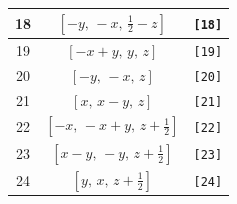 \documentclass[fleqn,8pt]{jsarticle}
\begin{document}
\begin{longtable}{ccc}
18 & $\left[ - y,\, - x,\, \frac{1}{2} - z \right]$ & {\tt [18]} \\ \hline
19 & $\left[ - x + y,\, y,\, z \right]$ & {\tt [19]} \\ \hline
20 & $\left[ - y,\, - x,\, z \right]$ & {\tt [20]} \\ \hline
21 & $\left[ x,\, x - y,\, z \right]$ & {\tt [21]} \\ \hline
22 & $\left[ - x,\, - x + y,\, z + \frac{1}{2} \right]$ & {\tt [22]} \\ \hline
23 & $\left[ x - y,\, - y,\, z + \frac{1}{2} \right]$ & {\tt [23]} \\ \hline
24 & $\left[ y,\, x,\, z + \frac{1}{2} \right]$ & {\tt [24]} \\
\end{longtable}
\end{document}
